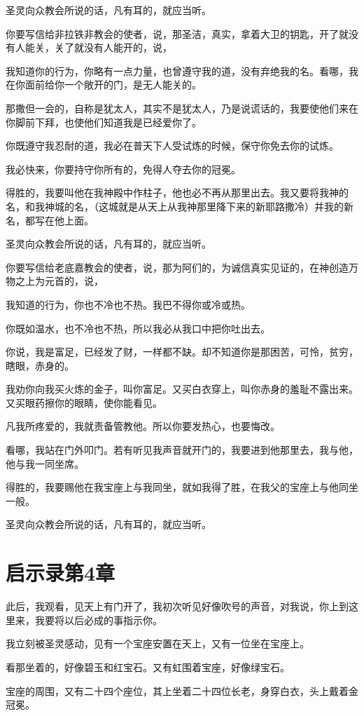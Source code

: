 \documentclass[12pt,oneside]{book}
\begin{document}
圣灵向众教会所说的话，凡有耳的，就应当听。

你要写信给非拉铁非教会的使者，说，那圣洁，真实，拿着大卫的钥匙，开了就没有人能关，关了就没有人能开的，说，

我知道你的行为，你略有一点力量，也曾遵守我的道，没有弃绝我的名。看哪，我在你面前给你一个敞开的门，是无人能关的。

那撒但一会的，自称是犹太人，其实不是犹太人，乃是说谎话的，我要使他们来在你脚前下拜，也使他们知道我是已经爱你了。

你既遵守我忍耐的道，我必在普天下人受试炼的时候，保守你免去你的试炼。

我必快来，你要持守你所有的，免得人夺去你的冠冕。

得胜的，我要叫他在我神殿中作柱子，他也必不再从那里出去。我又要将我神的名，和我神城的名，（这城就是从天上从我神那里降下来的新耶路撒冷）并我的新名，都写在他上面。

圣灵向众教会所说的话，凡有耳的，就应当听。

你要写信给老底嘉教会的使者，说，那为阿们的，为诚信真实见证的，在神创造万物之上为元首的，说，

我知道的行为，你也不冷也不热。我巴不得你或冷或热。

你既如温水，也不冷也不热，所以我必从我口中把你吐出去。

你说，我是富足，已经发了财，一样都不缺。却不知道你是那困苦，可怜，贫穷，瞎眼，赤身的。

我劝你向我买火炼的金子，叫你富足。又买白衣穿上，叫你赤身的羞耻不露出来。又买眼药擦你的眼睛，使你能看见。

凡我所疼爱的，我就责备管教他。所以你要发热心，也要悔改。

看哪，我站在门外叩门。若有听见我声音就开门的，我要进到他那里去，我与他，他与我一同坐席。

得胜的，我要赐他在我宝座上与我同坐，就如我得了胜，在我父的宝座上与他同坐一般。

圣灵向众教会所说的话，凡有耳的，就应当听。

\chapter{启示录第4章}
此后，我观看，见天上有门开了，我初次听见好像吹号的声音，对我说，你上到这里来，我要将以后必成的事指示你。

我立刻被圣灵感动，见有一个宝座安置在天上，又有一位坐在宝座上。

看那坐着的，好像碧玉和红宝石。又有虹围着宝座，好像绿宝石。

宝座的周围，又有二十四个座位，其上坐着二十四位长老，身穿白衣，头上戴着金冠冕。
\end{document}
